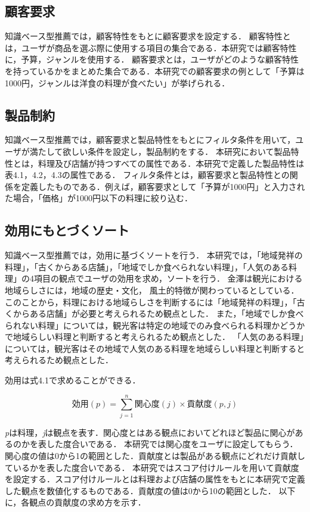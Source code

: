 \documentclass{funthesis}
\begin{document}
\subsection{顧客要求}
知識ベース型推薦では，顧客特性をもとに顧客要求を設定する．
顧客特性とは，ユーザが商品を選ぶ際に使用する項目の集合である．本研究では顧客特性に，予算，ジャンルを使用する．
顧客要求とは，ユーザがどのような顧客特性を持っているかをまとめた集合である．本研究での顧客要求の例として「予算は1000円，ジャンルは洋食の料理が食べたい」が挙げられる．

\subsection{製品制約}
知識ベース型推薦では，顧客要求と製品特性をもとにフィルタ条件を用いて，ユーザが満たして欲しい条件を設定し，製品制約をする．
本研究において製品特性とは，料理及び店舗が持つすべての属性である．本研究で定義した製品特性は表4.1，4.2，4.3の属性である．
フィルタ条件とは，顧客要求と製品特性との関係を定義したものである．例えば，顧客要求として「予算が1000円」と入力された場合，「価格」が1000円以下の料理に絞り込む．

\subsection{効用にもとづくソート}
知識ベース型推薦では，効用に基づくソートを行う．
本研究では，「地域発祥の料理」，「古くからある店舗」，「地域でしか食べられない料理」，「人気のある料理」の4項目の観点でユーザの効用を求め，ソートを行う．
金澤\cite{11}は観光における地域らしさには，地域の歴史・文化， 風土的特徴が関わっているとしている．このことから，料理における地域らしさを判断するには「地域発祥の料理」，「古くからある店舗」が必要と考えられるため観点とした．
また，「地域でしか食べられない料理」については，観光客は特定の地域でのみ食べられる料理かどうかで地域らしい料理と判断すると考えられるため観点とした．
「人気のある料理」については，観光客はその地域で人気のある料理を地域らしい料理と判断すると考えられるため観点とした．

効用は式4.1で求めることができる．

\begin{equation}
効用(p)=\sum_{j=1}^{n} 関心度(j)×貢献度(p,j) 
\end{equation}

{\it p}は料理，{\it j}は観点を表す．関心度とはある観点においてどれほど製品に関心があるのかを表した度合いである．
本研究では関心度をユーザに設定してもらう．関心度の値は0から1の範囲とした．貢献度とは製品がある観点にどれだけ貢献しているかを表した度合いである．
本研究ではスコア付けルールを用いて貢献度を設定する．スコア付けルールとは料理および店舗の属性をもとに本研究で定義した観点を数値化するものである．貢献度の値は0から10の範囲とした．
以下に，各観点の貢献度の求め方を示す．
\end{document}
